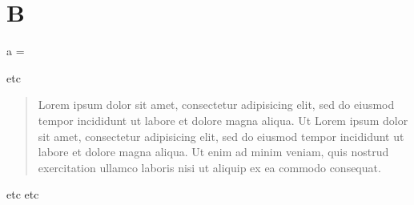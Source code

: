 \documentclass{article}
\begin{document}
\makeatletter



\makeatother                                
\section{B}
a
\makeatletter\clubpenalty=\@clubpenalty\makeatother %
  \beginnumbering
	
    \pstart
    etc
    
     \begin{quote} 
    Lorem ipsum dolor sit amet, consectetur adipisicing elit, sed do eiusmod tempor incididunt ut labore et dolore magna aliqua. Ut 
  Lorem ipsum dolor sit amet, consectetur adipisicing elit, sed do eiusmod tempor incididunt ut labore et dolore magna aliqua. Ut enim ad minim veniam, quis nostrud exercitation ullamco laboris nisi ut aliquip ex ea commodo consequat. 
    \end{quote}
   
   
   etc etc
   \pend
   \endnumbering
    
\end{document}
